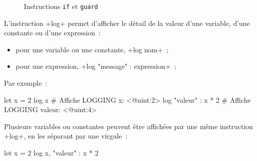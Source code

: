 \begin{figure}[ht]
  \centering
  \hspace{1cm}
  \caption{Instructions \texttt{if} et \texttt{guard}}
\end{figure}







L'instruction \ggst+log+ permet d'afficher le détail de la valeur d'une variable, d'une constante ou d'une expression~:
\begin{itemize}
  \item pour une variable ou une constante, \ggst+log nom+~;
  \item pour une expression, \ggst+log "message" : expression+~;
\end{itemize}

Par exemple~:
\begin{galgas3}
let x = 2
log x # Affiche LOGGING x: <@uint:2>
log "valeur" : x * 2 # Affiche LOGGING valeur: <@uint:4>
\end{galgas3}

Plusieurs variables ou constantes peuvent être affichées par une même instruction \ggst+log+, en les séparant par une virgule~:
\begin{galgas3}
let x = 2
log x, "valeur" : x * 2
\end{galgas3}














